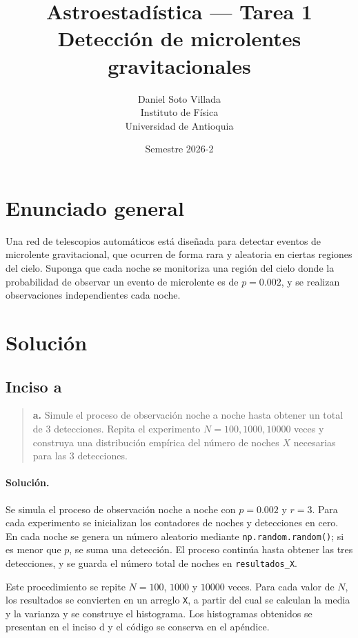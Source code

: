 \documentclass[11pt,a4paper]{article}
\title{Astroestadística --- Tarea 1\\[0.4em]
\large Detección de microlentes gravitacionales}
\author{Daniel Soto Villada\\
Instituto de Física\\
Universidad de Antioquia}
\date{Semestre 2026-2}
\begin{document}
\maketitle

\section*{Enunciado general}

Una red de telescopios automáticos está diseñada para detectar eventos de microlente gravitacional, que ocurren de forma rara y aleatoria en ciertas regiones del cielo. Suponga que cada noche se monitoriza una región del cielo donde la probabilidad de observar un evento de microlente es de $p = 0.002$, y se realizan observaciones independientes cada noche.

\section*{Solución}

\subsection*{Inciso a}

\begin{quote}
\textbf{a.} Simule el proceso de observación noche a noche hasta obtener un total de $3$ detecciones. Repita el experimento $N = 100, 1000, 10000$ veces y construya una distribución empírica del número de noches $X$ necesarias para las $3$ detecciones.
\end{quote}

\paragraph{Solución.}

Se simula el proceso de observación noche a noche con $p=0.002$ y $r=3$. Para cada experimento se inicializan los contadores de noches y detecciones en cero. En cada noche se genera un número aleatorio mediante \texttt{np.random.random()}; si es menor que $p$, se suma una detección. El proceso continúa hasta obtener las tres detecciones, y se guarda el número total de noches en \texttt{resultados\_X}.

Este procedimiento se repite $N=100$, $1000$ y $10000$ veces. Para cada valor de $N$, los resultados se convierten en un arreglo \texttt{X}, a partir del cual se calculan la media y la varianza y se construye el histograma. Los histogramas obtenidos se presentan en el inciso d y el código se conserva en el apéndice.
\end{document}

